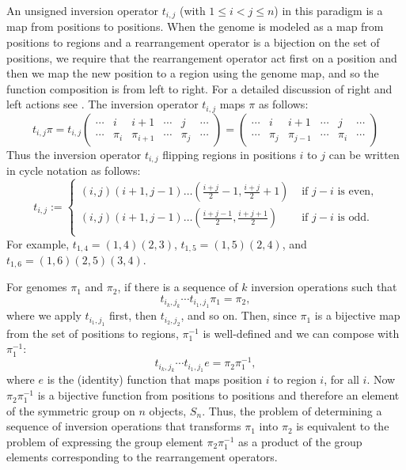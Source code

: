 \documentclass[utf8]{Frontiers_LaTex_Templates/frontiersFPHY} %
\newcommand{\tij}[1]{t_{#1}}
\newcommand{\id}{e}
\numberwithin{equation}{section}
\begin{document}
An unsigned inversion operator $\tij{i,j}$ (with $1\le i<j\le n$) in this paradigm is a map from positions to positions. 
When the genome is modeled as a map from positions to regions and a rearrangement operator is a bijection on the set of positions, we require that the rearrangement operator act first on a position and then we map the new position to a region using the genome map,
and so the function composition is from left to right. For a detailed discussion of right and left actions see \citet{bhatia2018position}. The inversion operator $\tij{i,j}$ maps $\pi$ as follows:
\[
\tij{i,j}\pi=
\tij{i,j} \begin{pmatrix}
\cdots & i     & i+1       & \cdots & j     & \cdots\\
\cdots & \pi_i & \pi_{i+1} & \cdots & \pi_j & \cdots
\end{pmatrix} =  
\begin{pmatrix}
\cdots & i & i+1 & \cdots & j & \cdots\\
\cdots & \pi_j & \pi_{j-1} & \cdots & \pi_i & \cdots
\end{pmatrix}
\]
Thus the inversion operator $\tij{i,j}$ flipping regions in positions $i$ to $j$ can be written in cycle notation as follows:
\[ \tij{i,j} := 
\begin{cases}
(i,j)(i+1, j-1)\dots (\frac{i+j}{2} - 1, \frac{i+j}{2} + 1) & \text{ if } j -i \text{ is even,} \\
(i,j)(i+1, j-1)\dots (\frac{i+j-1}{2}, \frac{i+j+1}{2}) & \text{ if } j -i \text{ is odd.} \\
\end{cases} \]
%
For example, $t_{1,4}=(1,4)(2,3)$, $t_{1,5}=(1, 5)(2, 4)$, and $t_{1,6} = (1, 6)(2, 5)(3, 4)$.

For genomes $\pi_1$ and $\pi_2$, if there is a sequence of $k$ inversion operations such that
\[\tij{i_k, j_k} \cdots \tij{i_1, j_1}\pi_1 = \pi_2,\]
where we apply $\tij{i_1, j_1}$ first, then $\tij{i_2, j_2}$, and so on. 
Then, since $\pi_1$ is a bijective map from the set of positions to regions, $\pi_1^{-1}$ is well-defined and we can compose with $\pi_1^{-1}$:
\[\tij{i_k, j_k} \cdots \tij{i_1, j_1} \id = \pi_2 \pi_1^{-1},\]
%
where $\id$ is the (identity) function that maps position $i$ to region $i$, for all $i$. Now $\pi_2 \pi_1^{-1}$ is a bijective function from positions to positions and therefore an element of the symmetric group on $n$ objects, $S_n$. Thus, the problem of determining a sequence of inversion operations that transforms $\pi_1$ into $\pi_2$ is equivalent to the problem of expressing the group element $\pi_2 \pi_1^{-1}$ as a product of the group elements corresponding to the rearrangement operators.
\end{document}
